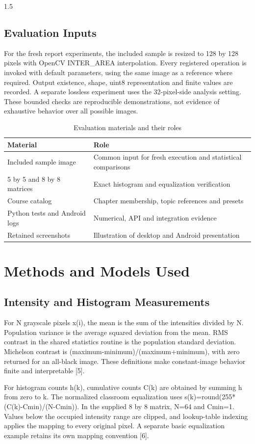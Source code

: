 \begin{spacing}{1.5}
\subsection{Evaluation Inputs}
For the fresh report experiments, the included sample is resized to 128 by 128 pixels with OpenCV INTER\_AREA interpolation. Every registered operation is invoked with default parameters, using the same image as a reference where required. Output existence, shape, uint8 representation and finite values are recorded. A separate lossless experiment uses the 32-pixel-side analysis setting. These bounded checks are reproducible demonstrations, not evidence of exhaustive behavior over all possible images.

\begin{table}[htbp]\centering\small
\caption{Evaluation materials and their roles}
\begin{tabularx}{\textwidth}{XX}
\toprule
\textbf{Material} & \textbf{Role}\\\midrule
Included sample image & Common input for fresh execution and statistical comparisons\\
5 by 5 and 8 by 8 matrices & Exact histogram and equalization verification\\
Course catalog & Chapter membership, topic references and presets\\
Python tests and Android logs & Numerical, API and integration evidence\\
Retained screenshots & Illustration of desktop and Android presentation\\
\bottomrule\end{tabularx}\end{table}
\section{Methods and Models Used}
\subsection{Intensity and Histogram Measurements}
For N grayscale pixels x(i), the mean is the sum of the intensities divided by N. Population variance is the average squared deviation from the mean. RMS contrast in the shared statistics routine is the population standard deviation. Michelson contrast is (maximum-minimum)/(maximum+minimum), with zero returned for an all-black image. These definitions make constant-image behavior finite and interpretable [5].

For histogram counts h(k), cumulative counts C(k) are obtained by summing h from zero to k. The normalized classroom equalization uses s(k)=round(255*(C(k)-Cmin)/(N-Cmin)). In the supplied 8 by 8 matrix, N=64 and Cmin=1. Values below the occupied intensity range are clipped, and lookup-table indexing applies the mapping to every original pixel. A separate basic equalization example retains its own mapping convention [6].


\end{spacing}
